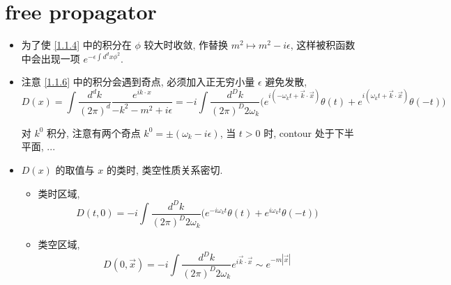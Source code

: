 \section{free propagator}
\begin{itemize}
	\item 为了使 \eqref{1.1.4} 中的积分在 $\phi$ 较大时收敛, 作替换 $m^2 \mapsto m^2 - i \epsilon$, 这样被积函数中会出现一项 $e^{- \epsilon \int d^d x \phi^2}$.
	
	\item 注意 \eqref{1.1.6} 中的积分会遇到奇点, 必须加入正无穷小量 $\epsilon$ 避免发散,
	\begin{equation}
		D(x) = \int \frac{d^d k}{(2 \pi)^d} \frac{e^{i k \cdot x}}{- k^2 - m^2 + i \epsilon} = - i \int \frac{d^D k}{(2 \pi)^D 2 \omega_k} \Big( e^{i (- \omega_k t + \vec{k} \cdot \vec{x})} \theta(t) + e^{i (\omega_k t + \vec{k} \cdot \vec{x})} \theta(- t) \Big)
	\end{equation}
	
	\begin{tcolorbox}[title=calculation:]
		对 $k^0$ 积分, 注意有两个奇点 $k^0 = \pm (\omega_k - i \epsilon)$, 当 $t > 0$ 时, contour 处于下半平面, ...
	\end{tcolorbox}
	
	\item $D(x)$ 的取值与 $x$ 的类时, 类空性质关系密切.
	\begin{itemize}
		\item 类时区域,
		\begin{equation}
			D(t, 0) = - i \int \frac{d^D k}{(2 \pi)^D 2 \omega_k} \Big( e^{- i \omega_k t} \theta(t) + e^{i \omega_k t} \theta(- t) \Big)
		\end{equation}
		
		\item 类空区域,
		\begin{equation}
			D(0, \vec{x}) = - i \int \frac{d^D k}{(2 \pi)^D 2 \omega_k} e^{i \vec{k} \cdot \vec{x}} \sim e^{- m |\vec{x}|}
		\end{equation}
	\end{itemize}
\end{itemize}
